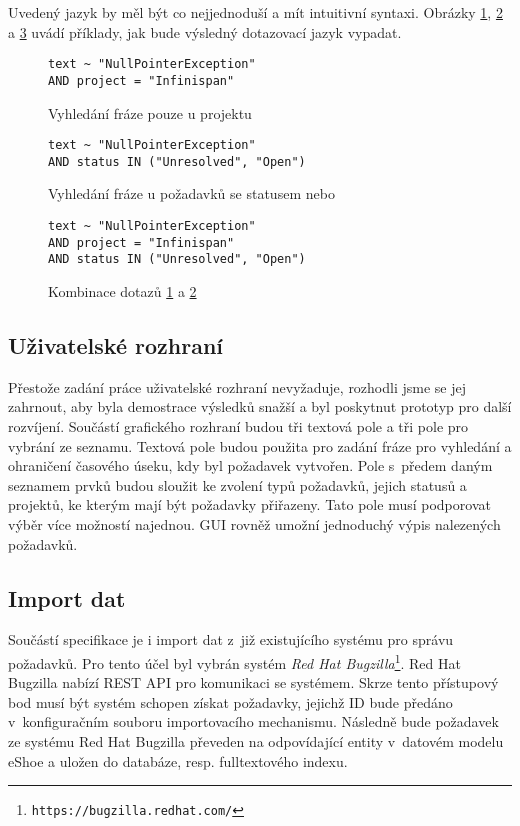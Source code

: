 \documentclass[11pt,oneside]{fithesis2}
\begin{document}
Uvedený jazyk by měl být co nejjednoduší a mít intuitivní syntaxi. Obrázky \ref{QueryLanguageExample1}, \ref{QueryLanguageExample2} a \ref{QueryLanguageExample3} uvádí příklady, jak bude výsledný dotazovací jazyk vypadat.

\begin{figure}[htbp]
\begin{lstlisting}[frame=single]
text ~ "NullPointerException"
AND project = "Infinispan"
\end{lstlisting}
\caption{Vyhledání fráze  pouze u projektu }
\label{QueryLanguageExample1}
\end{figure}

\begin{figure}[htbp]
\begin{lstlisting}[frame=single]
text ~ "NullPointerException" 
AND status IN ("Unresolved", "Open")
\end{lstlisting}
\caption{Vyhledání fráze  u požadavků se statusem  nebo }
\label{QueryLanguageExample2}
\end{figure}

\begin{figure}[htbp]
\begin{lstlisting}[frame=single]
text ~ "NullPointerException" 
AND project = "Infinispan" 
AND status IN ("Unresolved", "Open")
\end{lstlisting}
\caption{Kombinace dotazů \ref{QueryLanguageExample1} a \ref{QueryLanguageExample2}}
\label{QueryLanguageExample3}
\end{figure}

\subsection{Uživatelské rozhraní}
Přestože zadání práce uživatelské rozhraní nevyžaduje, rozhodli jsme se jej zahrnout, aby byla demostrace výsledků snažší a byl poskytnut prototyp pro další rozvíjení. Součástí grafického rozhraní budou tři textová pole a tři pole pro vybrání ze seznamu. Textová pole budou použita pro zadání fráze pro vyhledání a ohraničení časového úseku, kdy byl požadavek vytvořen. Pole s~předem daným seznamem prvků budou sloužit ke zvolení typů požadavků, jejich statusů a projektů, ke kterým mají být požadavky přiřazeny. Tato pole musí podporovat výběr více možností najednou. GUI rovněž umožní jednoduchý výpis nalezených požadavků.

\subsection{Import dat}
Součástí specifikace je i import dat z~již existujícího systému pro správu požadavků. Pro tento účel byl vybrán systém \emph{Red Hat Bugzilla}\footnote{\texttt{https://bugzilla.redhat.com/}}. Red Hat Bugzilla nabízí REST API pro komunikaci se systémem. Skrze tento přístupový bod musí být systém schopen získat požadavky, jejichž ID bude předáno v~konfiguračním souboru importovacího mechanismu. Následně bude požadavek ze systému Red Hat Bugzilla převeden na odpovídající entity v~datovém modelu eShoe a uložen do databáze, resp. fulltextového indexu.
\end{document}
